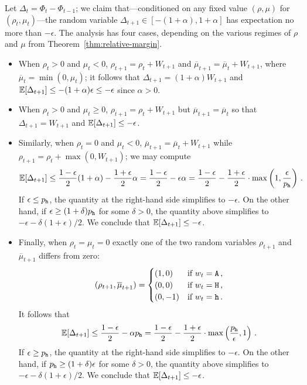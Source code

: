   Let $\Delta_t = \Phi_t - \Phi_{t-1}$; we claim that---conditioned
  on any fixed value $(\rho, \mu)$ for $(\rho_t, \mu_t)$---the
  random variable $\Delta_{t+1} \in [-(1 + \alpha),1+ \alpha]$ has
  expectation no more than $-\epsilon$. The analysis has four cases,
  depending on the various regimes of $\rho$ and $\mu$ from Theorem~\ref{thm:relative-margin}. 
  \begin{itemize}
    \item
    When $\rho_t > 0$ and $\mu_t < 0$,
    $\rho_{t+1} = \rho_t + W_{t+1}$ and
    $\overline{\mu}_{t+1} = \overline{\mu}_t + W_{t+1}$, where
    $\overline{\mu}_t = \min(0,\mu_t)$; it follows that
    $\Delta_{t+1} = (1 + \alpha)W_{t+1}$ and
    $\operatorname{\mathbb{E}}[\Delta_{t+1} ] \leq -(1 + \alpha)\epsilon \leq -\epsilon$ 
    since $\alpha > 0$.

    \item
    When
    $\rho_t > 0$ and $\mu_t \geq 0$, $\rho_{t+1} = \rho_t + W_{t+1}$
    but $\overline{\mu}_{t+1} = \overline{\mu}_t$ so that
    $\Delta_{t+1} = W_{t+1}$ and $\operatorname{\mathbb{E}}[\Delta_{t+1} ] \leq -\epsilon$. 

    \item
    Similarly, when
    $\rho_t = 0$ and $\mu_t < 0$,
    $\overline{\mu}_{t+1} = \overline{\mu}_t + W_{t+1}$ while
    $\rho_{t+1} = \rho_t + \max(0, W_{t+1})$; we may compute
    \[
      \operatorname{\mathbb{E}}[\Delta_{t+1} ] \leq \frac{1 - \epsilon}{2}(1 + \alpha) - \frac{1 +
        \epsilon}{2}\alpha = \frac{1 - \epsilon}{2} - \epsilon\alpha =
      \frac{1 - \epsilon}{2} - \frac{1+\epsilon}{2} \cdot \max\left(1, \frac{\epsilon}{p_{\mathtt{h}}}\right)\,.
    \]
    If $\epsilon \leq p_{\mathtt{h}}$, the quantity at the right-hand side simplifies to $-\epsilon$. 
    On the other hand, if $\epsilon \geq (1+\delta) p_{\mathtt{h}}$ for some $\delta > 0$, 
    the quantity above simplifies to $-\epsilon - \delta (1+\epsilon)/2$.
    We conclude that $\operatorname{\mathbb{E}}[\Delta_{t+1} ] \leq -\epsilon$.

    \item
    Finally, when $\rho_t = \mu_t = 0$ exactly one of the two random
    variables $\rho_{t+1}$ and $\overline{\mu}_{t+1}$ differs from
    zero: 
    \begin{align*}      
      (\rho_{t+1}, \overline{\mu}_{t+1}) = \begin{cases}
        (1,0) & \text{if $w_t = \mathtt{A}$}\,, \\
        (0,0) & \text{if $w_t = \mathtt{H}$}\,, \\
        (0,-1) & \text{if $w_t = \mathtt{h}$}\,.
      \end{cases}
    \end{align*}
    It follows that
    \[
      \operatorname{\mathbb{E}}[\Delta_{t+1} ] 
      \leq \frac{1 - \epsilon}{2} - \alpha p_{\mathtt{h}} 
      = \frac{1 - \epsilon}{2} - \frac{1+\epsilon}{2} \cdot \max\left(\frac{p_{\mathtt{h}}}{\epsilon}, 1 \right)\,.
    \]
    If $\epsilon \geq p_{\mathtt{h}}$, the quantity at the right-hand side simplifies to $-\epsilon$. 
    On the other hand, if $p_{\mathtt{h}} \geq (1+\delta) \epsilon$ for some $\delta > 0$, 
    the quantity above simplifies to $-\epsilon - \delta (1+\epsilon)/2$.
    We conclude that $\operatorname{\mathbb{E}}[\Delta_{t+1} ] \leq -\epsilon$.
  \end{itemize}

